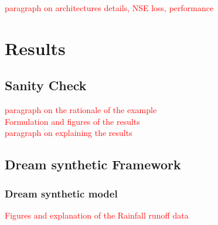 \documentclass[12pt]{report}
\begin{document}
\textcolor{red}{paragraph on architectures details, NSE loss, performance}\\

\newpage


\chapter{Results} 
 
\section{Sanity Check}
\textcolor{red}{paragraph on the rationale of the example}\\

\textcolor{red}{Formulation and figures of the results}\\

\textcolor{red}{paragraph on explaining the results}\\
\newpage
\section{Dream synthetic Framework}
\subsection{Dream synthetic model}
\textcolor{red}{Figures and explanation of the Rainfall runoff data}\\
\end{document}
